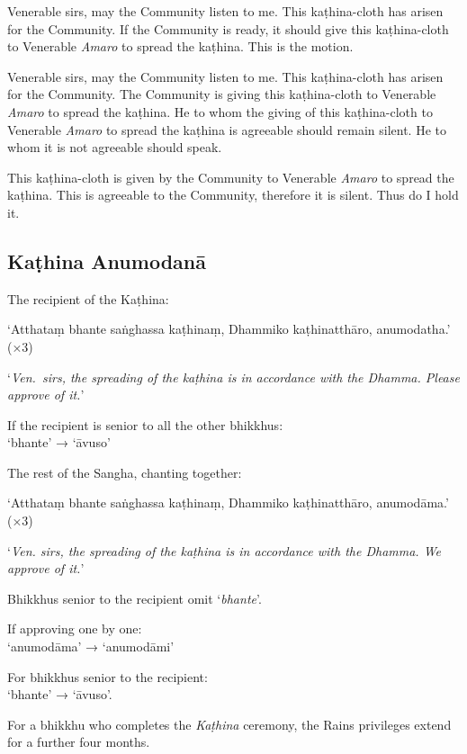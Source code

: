 
\begin{english}

Venerable sirs, may the Community listen to me. This kaṭhina-cloth has arisen
for the Community. If the Community is ready, it should give this kaṭhina-cloth
to Venerable \emph{Amaro} to spread the kaṭhina. This is the motion.

Venerable sirs, may the Community listen to me. This kaṭhina-cloth has arisen
for the Community. The Community is giving this kaṭhina-cloth to Venerable
\emph{Amaro} to spread the kaṭhina. He to whom the giving of this kaṭhina-cloth
to Venerable \emph{Amaro} to spread the kaṭhina is agreeable should remain
silent. He to whom it is not agreeable should speak.

This kaṭhina-cloth is given by the Community to Venerable \emph{Amaro} to
spread the kaṭhina. This is agreeable to the Community, therefore it is silent.
Thus do I hold it.

\end{english}

\subsection{Kaṭhina Anumodanā}

The recipient of the Kaṭhina:

‘Atthataṃ bhante saṅghassa kaṭhinaṃ, Dhammiko kaṭhinatthāro, anumodatha.’ (×3)

‘\emph{Ven.\ sirs, the spreading of the kaṭhina is in accordance with the Dhamma.
  Please approve of it.}’

If the recipient is senior to all the other bhikkhus:\\
‘bhante’ → ‘āvuso’

The rest of the Sangha, chanting together:

‘Atthataṃ bhante saṅghassa kaṭhinaṃ, Dhammiko kaṭhinatthāro, anumodāma.’ (×3)

‘\emph{Ven. sirs, the spreading of the kaṭhina is in accordance with the Dhamma.
  We approve of it.}’


Bhikkhus senior to the recipient omit ‘\emph{bhante}’.

If approving one by one:\\
‘anumodāma’ → ‘anumodāmi’

For bhikkhus senior to the recipient:\\
‘bhante’ → ‘āvuso’.

For a bhikkhu who completes the \emph{Kaṭhina} ceremony, the Rains privileges
extend for a further four months.


